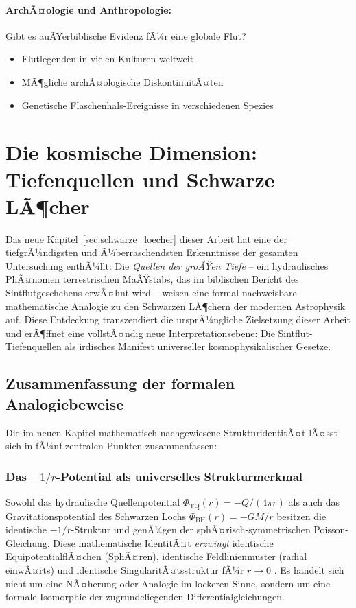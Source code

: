 ﻿\documentclass[12pt,a4paper]{report}
\begin{document}
\paragraph{ArchÃ¤ologie und Anthropologie:}
Gibt es auÃŸerbiblische Evidenz fÃ¼r eine globale Flut?
\begin{itemize}
	\item Flutlegenden in vielen Kulturen weltweit
	\item MÃ¶gliche archÃ¤ologische DiskontinuitÃ¤ten
	\item Genetische Flaschenhals-Ereignisse in verschiedenen Spezies
\end{itemize}

\section{Die kosmische Dimension: Tiefenquellen und Schwarze LÃ¶cher}
\label{sec:zusammenfassung_analogie}

Das neue Kapitel~\ref{sec:schwarze_loecher} dieser Arbeit hat eine der tiefgrÃ¼ndigsten und Ã¼berraschendsten Erkenntnisse der gesamten Untersuchung enthÃ¼llt: Die \textit{Quellen der groÃŸen Tiefe} -- ein hydraulisches PhÃ¤nomen terrestrischen MaÃŸstabs, das im biblischen Bericht des Sintflutgeschehens erwÃ¤hnt wird -- weisen eine formal nachweisbare mathematische Analogie zu den Schwarzen LÃ¶chern der modernen Astrophysik auf. Diese Entdeckung transzendiert die ursprÃ¼ngliche Zielsetzung dieser Arbeit und erÃ¶ffnet eine vollstÃ¤ndig neue Interpretationsebene: Die Sintflut-Tiefenquellen als irdisches Manifest universeller kosmophysikalischer Gesetze.

\subsection{Zusammenfassung der formalen Analogiebeweise}

Die im neuen Kapitel mathematisch nachgewiesene StrukturidentitÃ¤t lÃ¤sst sich in fÃ¼nf zentralen Punkten zusammenfassen:

\subsubsection{Das $-1/r$-Potential als universelles Strukturmerkmal}

Sowohl das hydraulische Quellenpotential $\Phi_{\mathrm{TQ}}(r) = -Q/(4\pi r)$ als auch das Gravitationspotential des Schwarzen Lochs $\Phi_{\mathrm{BH}}(r) = -GM/r$ besitzen die identische $-1/r$-Struktur und genÃ¼gen der sphÃ¤risch-symmetrischen Poisson-Gleichung. Diese mathematische IdentitÃ¤t \emph{erzwingt} identische EquipotentialflÃ¤chen (SphÃ¤ren), identische Feldlinienmuster (radial einwÃ¤rts) und identische SingularitÃ¤tsstruktur fÃ¼r $r \rightarrow 0$ \cite{misner1973,lamb1932}. Es handelt sich nicht um eine NÃ¤herung oder Analogie im lockeren Sinne, sondern um eine formale Isomorphie der zugrundeliegenden Differentialgleichungen.
\end{document}

